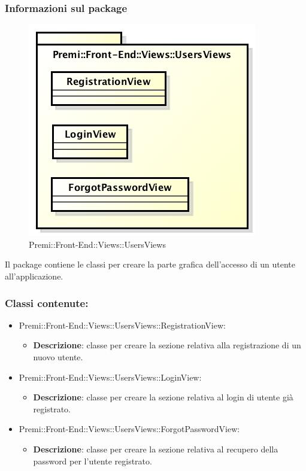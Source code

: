 	\subsubsection*{Informazioni sul package}
	\begin{figure}[h]
		\centering
		\includegraphics[width=0.7\linewidth]{img/front-end_views_usersviews}
		\caption[Premi::Front-End::Views::UsersViews]{Premi::Front-End::Views::UsersViews}
	\end{figure}
	Il package contiene le classi per creare la parte grafica dell'accesso di un utente all'applicazione.
	
	\subsubsection*{Classi contenute:}
	\begin{itemize}
		
		\item Premi::Front-End::Views::UsersViews::RegistrationView:
		\begin{itemize}
			\item \textbf{Descrizione}: classe per creare la sezione relativa alla registrazione di un nuovo utente.
		\end{itemize}
		
		\item Premi::Front-End::Views::UsersViews::LoginView:
		\begin{itemize}
			\item \textbf{Descrizione}: classe per creare la sezione relativa al login di utente già registrato.
		\end{itemize}
		
		\item Premi::Front-End::Views::UsersViews::ForgotPasswordView:
		\begin{itemize}
			\item \textbf{Descrizione}: classe per creare la sezione relativa al recupero della password per l'utente registrato.
		\end{itemize}
	\end{itemize}
	

